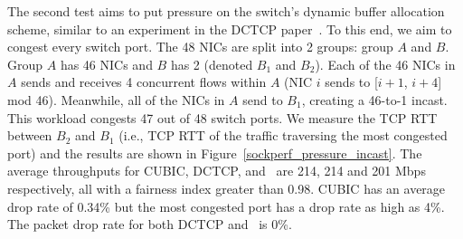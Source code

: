{\crs The second test aims to put pressure on the switch's dynamic 
buffer allocation scheme, similar to an experiment in the DCTCP paper~\cite{dctcp}.} To this end, we aim to congest every switch port.
The 48 NICs are split into 2 groups: group $A$ and $B$. 
Group $A$ has 46 NICs and $B$ has 2 (denoted $B_1$ and $B_2$). 
Each of the 46 NICs in $A$ sends and receives 4 concurrent flows within $A$ 
(\ie{}NIC $i$ sends to [$i+1$, $i+4$] mod 46). 
Meanwhile, all of the NICs in $A$ send to $B_1$, creating a 46-to-1 incast. 
This workload congests 47 out of 48 switch ports. 
We measure the TCP RTT between $B_2$ and $B_1$ (i.e., TCP RTT of the traffic traversing the most congested port) and 
the results are shown in Figure~\ref{sockperf_pressure_incast}. 
The average throughputs for CUBIC, DCTCP, and~\acdc{} are 214, 214 and 201 Mbps respectively, 
all with a fairness index greater than 0.98. 
CUBIC has an average drop rate of 0.34\% but the most congested port has a drop rate as high as 4\%. 
The packet drop rate for both DCTCP and~\acdc{} is 0\%.



